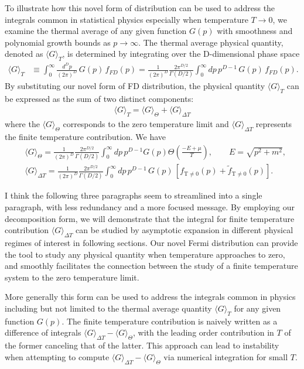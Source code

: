 \documentclass[sn-mathphys,Numbered]{sn-jnl}
\newcommand*{\xblue}{\color{blue}}
\begin{document}
To illustrate  how this novel form of distribution can be used to address the integrals common in statistical physics especially when temperature $T\to0$, we examine the thermal average of any given function $G(p)$ with smoothness and polynomial growth bounds  as $p\to \infty$. The thermal average physical quantity, denoted as $\langle G\rangle_T$, is determined by integrating over the D-dimensional phase space 
\begin{align}\label{eq:avg_G_T}
\langle G\rangle_T&\equiv\int^{\infty}_{0}\!\!\frac{d^Dp}{(2\pi)^D}\,G(p)\,f_{FD}(p)=\frac{1}{(2\pi)^D}\frac{2\pi^{D/2}}{\Gamma(D/2)}\int^{\infty}_{0}\!\!dp\,p^{D-1}\,G(p)\,f_{FD}(p).
\end{align}
By substituting our novel form of FD distribution, the physical quantity $\langle G\rangle_T$ can be expressed as the sum of two distinct components:
\begin{align}
\langle G\rangle_T=\langle G\rangle_{\Theta}+\langle G\rangle_{\Delta T}
\end{align}
 where the $\langle G\rangle_{\Theta}$ corresponds to the zero temperature limit and $\langle G\rangle_{\Delta T}$ represents the finite temperature contribution. We have
\begin{align}
&\langle G\rangle_{\Theta}=\frac{1}{(2\pi)^D}\frac{2\pi^{D/2}}{\Gamma(D/2)}\int^{\infty}_{0}\!\!dp\,p^{D-1}G(p)\Theta\left(\frac{-E+\mu}{T}\right),\qquad E=\sqrt{p^2+m^2},\\
&\langle G\rangle_{\Delta T}=\frac{1}{(2\pi)^D}\frac{2\pi^{D/2}}{\Gamma(D/2)}\int^{\infty}_{0}\!\!dp\,p^{D-1}\,G(p)\,\left[f_\mathrm{T\neq0}(p)+\widetilde f_\mathrm{T\neq0}(p)\right].\label{G_deltaT}
\end{align}

{\xblue I think the following three paragraphs seem to streamlined into a single paragraph, with less redundancy and a more focused message.}
By employing our decomposition form, we will demonstrate that the integral for finite temperature contribution $\langle G\rangle_{\Delta T}$ can be studied by asymptotic expansion in different physical regimes of interest  in following sections. Our novel Fermi distribution can provide the tool to study any physical quantity when temperature approaches to zero, and  smoothly facilitates the connection between the study of a finite temperature system to the zero temperature limit. 

More generally this form can be used to address the integrals common in physics including but not limited to the thermal average quantity $\langle G\rangle_T$ for any given function $G(p)$. The finite temperature contribution is naively written as a difference of integrals $\langle G\rangle_{\Delta T}-\langle G\rangle_\Theta$, with the leading order contribution in $T$ of the former canceling that of the latter. This approach can lead  to instability when attempting to compute $\langle G\rangle_{\Delta T}-\langle G\rangle_\Theta$ via numerical integration for small $T$. 
\end{document}

